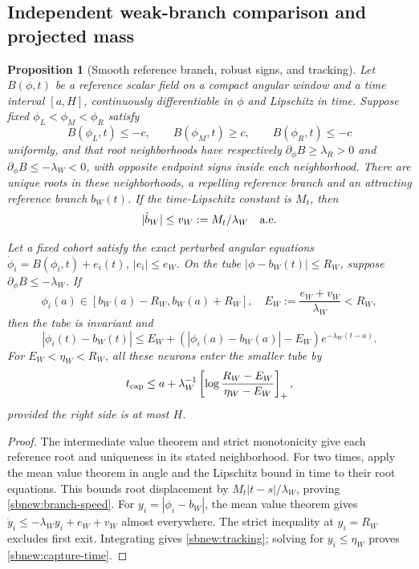 \documentclass{article} %
\theoremstyle{plain}
\newtheorem{proposition}[theorem]{Proposition}
\theoremstyle{definition}
\theoremstyle{remark}
\begin{document}
\subsection{Independent weak-branch comparison and projected mass}
\begin{proposition}[Smooth reference branch, robust signs, and tracking]
\label{sbnew:weak-comparison}
Let $B(\phi,t)$ be a reference scalar field on a compact angular window
and a time interval $[a,H]$, continuously differentiable in $\phi$ and
Lipschitz in time. Suppose fixed $\phi_L<\phi_M<\phi_R$ satisfy
\[
 B(\phi_L,t)\le-c,\qquad B(\phi_M,t)\ge c,
 \qquad B(\phi_R,t)\le-c
\]
uniformly, and that root neighborhoods have respectively
$\partial_\phi B\ge\lambda_R>0$ and
$\partial_\phi B\le-\lambda_W<0$, with opposite endpoint signs
inside each neighborhood. There are unique roots in these neighborhoods,
a repelling reference branch and an attracting reference branch $b_W(t)$.
If the time-Lipschitz constant is $M_t$, then
\begin{equation}\label{sbnew:branch-speed}
 |\dot b_W|\le v_W:=M_t/\lambda_W\quad\hbox{a.e.}
\end{equation}

Let a fixed cohort satisfy the exact perturbed angular equations
$\dot\phi_i=B(\phi_i,t)+e_i(t)$, $|e_i|\le e_W$.
On the tube $|\phi-b_W(t)|\le R_W$, suppose
$\partial_\phi B\le-\lambda_W$. If
\begin{equation}\label{sbnew:tracking-cond}
 \phi_i(a)\in[b_W(a)-R_W,b_W(a)+R_W],\quad
 E_W:=\frac{e_W+v_W}{\lambda_W}<R_W,
\end{equation}
then the tube is invariant and
\begin{equation}\label{sbnew:tracking}
 |\phi_i(t)-b_W(t)|\le
 E_W+(|\phi_i(a)-b_W(a)|-E_W)e^{-\lambda_W(t-a)}.
\end{equation}
For $E_W<\eta_W<R_W$, all these neurons enter the smaller tube by
\begin{equation}\label{sbnew:capture-time}
 t_{\rm cap}\le a+\lambda_W^{-1}
 \left[\log\frac{R_W-E_W}{\eta_W-E_W}\right]_+,
\end{equation}
provided the right side is at most $H$.
\end{proposition}
\begin{proof}
The intermediate value theorem and strict monotonicity give each reference
root and uniqueness in its stated neighborhood. For two times, apply
the mean value theorem in angle and the Lipschitz bound in time to their
root equations. This bounds root displacement by
$M_t|t-s|/\lambda_W$, proving \eqref{sbnew:branch-speed}.
For $y_i=|\phi_i-b_W|$, the mean value theorem gives
$\dot y_i\le-\lambda_Wy_i+e_W+v_W$ almost everywhere.
The strict inequality at $y_i=R_W$ excludes first exit. Integrating gives
\eqref{sbnew:tracking}; solving for $y_i\le\eta_W$ proves
\eqref{sbnew:capture-time}.
\end{proof}
\end{document}
